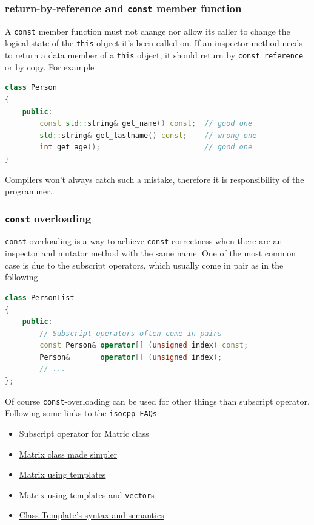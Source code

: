 \subsubsection{return-by-reference and \texttt{const} member function}
A \texttt{const} member function must not change nor allow its caller to 
change the logical state of the \texttt{this} object it's been called 
on.
\newline
If an inspector method needs to return a data member of a \texttt{this} 
object, it should return by \texttt{const reference} or by copy. 
For example
\begin{lstlisting}[language=C++]
class Person
{
    public:
        const std::string& get_name() const;  // good one
        std::string& get_lastname() const;    // wrong one
        int get_age();                        // good one
}
\end{lstlisting}

Compilers won't always catch such a mistake, therefore it is 
responsibility of the programmer.

\subsubsection{\texttt{const} overloading}
\texttt{const} overloading is a way to achieve \texttt{const} 
correctness when there are an inspector and mutator method with the 
same name. One of the most common case is due to  the subscript 
operators, which usually come in pair as in the following
\begin{lstlisting}[language=C++]
class PersonList
{
    public:
        // Subscript operators often come in pairs
        const Person& operator[] (unsigned index) const;  
        Person&       operator[] (unsigned index);        
        // ...
};
\end{lstlisting}
Of course \texttt{const}-overloading can be used for other things than 
subscript operator.
\newline
Following some links to the \texttt{isocpp FAQs}
\begin{itemize}
    \item \href{https://isocpp.org/wiki/faq/operator-overloading#matrix-subscript-op}{Subscript operator for Matric class}
    \item \href{https://isocpp.org/wiki/faq/freestore-mgmt#multidim-arrays2}{Matrix class made simpler}
    \item \href{https://isocpp.org/wiki/faq/freestore-mgmt#multidim-arrays3}{Matrix using templates}
    \item \href{https://isocpp.org/wiki/faq/freestore-mgmt#multidim-arrays4}{Matrix using templates and \texttt{vector}s}
    \item \href{https://isocpp.org/wiki/faq/templates#class-templates}{Class Template's syntax and semantics}
\end{itemize}


